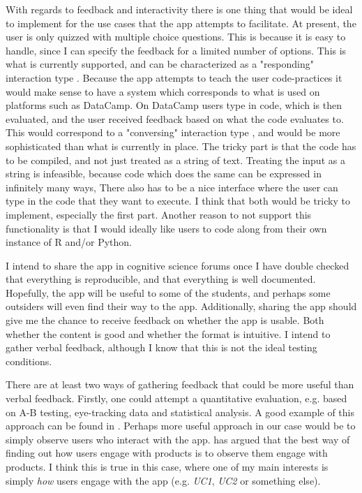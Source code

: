 \documentclass[12pt]{article}
\begin{document}
With regards to feedback and interactivity there is one thing that would be ideal
to implement for the use cases that the app attempts to facilitate. At present,
the user is only quizzed with multiple choice questions. This is because it is easy
to handle, since I can specify the feedback for a limited number of options.
This is what is currently supported, and can be characterized as a
"responding" interaction type \autocite[81]{rogers2011interaction}.
Because the app attempts to teach the user code-practices it would make sense to
have a system which corresponds to what is used on platforms such as DataCamp.
On DataCamp users type in code, which is then evaluated, and the user received feedback
based on what the code evaluates to. This would correspond to a "conversing"
interaction type \autocite[81]{rogers2011interaction},
and would be more sophisticated than what is currently in
place. The tricky part is that the code has to be
compiled,
and not just treated as a string of text. Treating the input as a string
is infeasible, because code which does the same can be expressed in infinitely many ways,
There also has to be a nice interface where the user can type in the code that
they want to execute. I think that both would be tricky to implement, especially the
first part. Another reason to not support this functionality is that I would ideally
like users to code along from their own instance of R and/or Python.

\vspace{5mm}

I intend to share the app in cognitive science forums once I have double checked
that everything is reproducible, and that everything is well documented. Hopefully,
the app will be useful to some of the students, and perhaps some outsiders will even
find their way to the app. Additionally, sharing the app should give me the chance
to receive feedback on whether the app is usable. Both whether the content is good
and whether the format is intuitive. I intend to gather verbal feedback,
although I know that this is not the ideal testing conditions.

\vspace{5mm}

There are at least two ways of gathering feedback that could be more useful
than verbal feedback. Firstly, one could attempt a quantitative evaluation,
e.g. based on A-B testing, eye-tracking data and statistical analysis.
A good example of this approach can be found in \textcite{sutcliffe2016}.
Perhaps more useful approach in our case would be to simply observe users who interact
with the app. \textcite{norman1999} has argued that the best way of finding
out how users engage with products is to observe them engage with products.
I think this is true in this case, where one of my main interests is simply
\emph{how} users engage with the app (e.g. \emph{UC1}, \emph{UC2} or something
else).
\end{document}
